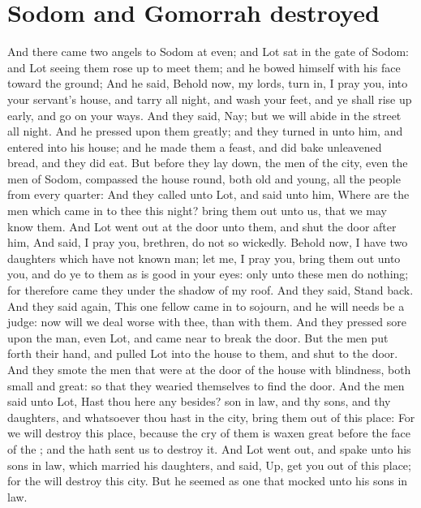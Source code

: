 \flushcolsend\columnbreak %

\section*{Sodom and Gomorrah destroyed}
\begin{biblechapter} %
\verse And there came two angels to Sodom at even; and Lot sat in the gate of Sodom: and Lot seeing them rose up to meet them; and he bowed himself with his face toward the ground;
\verse And he said, Behold now, my lords, turn in, I pray you, into your servant's house, and tarry all night, and wash your feet, and ye shall rise up early, and go on your ways. And they said, Nay; but we will abide in the street all night.
\verse And he pressed upon them greatly; and they turned in unto him, and entered into his house; and he made them a feast, and did bake unleavened bread, and they did eat.
\verse But before they lay down, the men of the city, even the men of Sodom, compassed the house round, both old and young, all the people from every quarter:
\verse And they called unto Lot, and said unto him, Where are the men which came in to thee this night? bring them out unto us, that we may know them.
\verse And Lot went out at the door unto them, and shut the door after him,
\verse And said, I pray you, brethren, do not so wickedly.
\verse Behold now, I have two daughters which have not known man; let me, I pray you, bring them out unto you, and do ye to them as is good in your eyes: only unto these men do nothing; for therefore came they under the shadow of my roof.
\verse And they said, Stand back. And they said again, This one fellow came in to sojourn, and he will needs be a judge: now will we deal worse with thee, than with them. And they pressed sore upon the man, even Lot, and came near to break the door.
\verse But the men put forth their hand, and pulled Lot into the house to them, and shut to the door.
\verse And they smote the men that were at the door of the house with blindness, both small and great: so that they wearied themselves to find the door.
\verse And the men said unto Lot, Hast thou here any besides? son in law, and thy sons, and thy daughters, and whatsoever thou hast in the city, bring them out of this place:
\verse For we will destroy this place, because the cry of them is waxen great before the face of the \LORD; and the \LORD hath sent us to destroy it.
\verse And Lot went out, and spake unto his sons in law, which married his daughters, and said, Up, get you out of this place; for the \LORD will destroy this city. But he seemed as one that mocked unto his sons in law.

\end{biblechapter}
